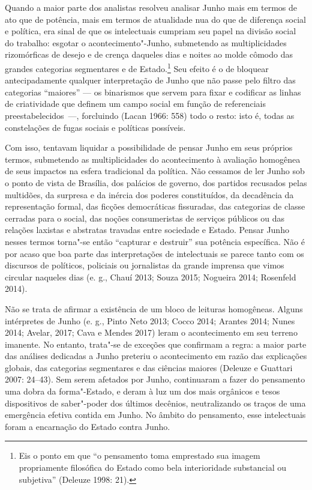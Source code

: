 Quando a maior parte dos analistas
resolveu analisar Junho mais em termos de ato que de potência, mais em
termos de atualidade nua do que de diferença social e política, era
sinal de que os intelectuais cumpriam seu papel na divisão social do
trabalho: esgotar o acontecimento"-Junho, submetendo as multiplicidades
rizomórficas de desejo e de crença daqueles dias e noites ao molde
cômodo das grandes categorias segmentares e de Estado.\footnote{Eis o
  ponto em que ``o pensamento toma emprestado sua imagem
  propriamente filosófica do Estado como bela interioridade substancial
  ou subjetiva'' (Deleuze 1998: 21).} Seu efeito é o de bloquear
antecipadamente qualquer interpretação de Junho que não passe pelo
filtro das categorias ``maiores'' --- os binarismos que servem para fixar
e codificar as linhas de criatividade que definem um campo social em
função de referenciais preestabelecidos~---, forcluindo (Lacan 1966:
558) todo o resto: isto é, todas as constelações de fugas sociais e
políticas possíveis.

Com isso, tentavam liquidar a possibilidade de pensar Junho em seus
próprios termos, submetendo as multiplicidades do acontecimento à
avaliação homogênea de seus impactos na esfera tradicional da política.
Não cessamos de ler Junho sob o ponto de vista de Brasília, dos palácios
de governo, dos partidos recusados pelas multidões, da surpresa e da
inércia dos poderes constituídos, da decadência da representação formal,
das ficções democráticas fissuradas, das categorias de classe cerradas
para o social, das noções consumeristas de serviços públicos ou das
relações laxistas e abstratas travadas entre sociedade e Estado. Pensar
Junho nesses termos torna"-se então ``capturar e destruir'' sua potência
específica. Não é por acaso que boa parte das interpretações de
intelectuais se parece tanto com os discursos de políticos, policiais ou
jornalistas da grande imprensa que vimos circular naqueles dias (e. g.,
Chauí 2013; Souza 2015; Nogueira 2014; Rosenfeld 2014).

Não se trata de afirmar a existência de um bloco de leituras homogêneas.
Alguns intérpretes de Junho (e. g., Pinto Neto 2013; Cocco 2014; Arantes 2014;
Nunes 2014; Avelar, 2017; Cava e Mendes 2017) leram o
acontecimento em seu terreno imanente. No entanto, trata"-se de exceções
que confirmam a regra: a maior parte das análises dedicadas a Junho
preteriu o acontecimento em razão das explicações globais, das
categorias segmentares e das ciências maiores (Deleuze e Guattari 2007:
24--43). Sem serem afetados por Junho, continuaram a fazer do pensamento
uma dobra da forma"-Estado, e deram à luz um dos mais orgânicos e tesos
dispositivos de saber"-poder dos últimos decênios, neutralizando os
traços de uma emergência efetiva contida em Junho. No âmbito do
pensamento, esse intelectuais foram a encarnação do Estado contra Junho.

